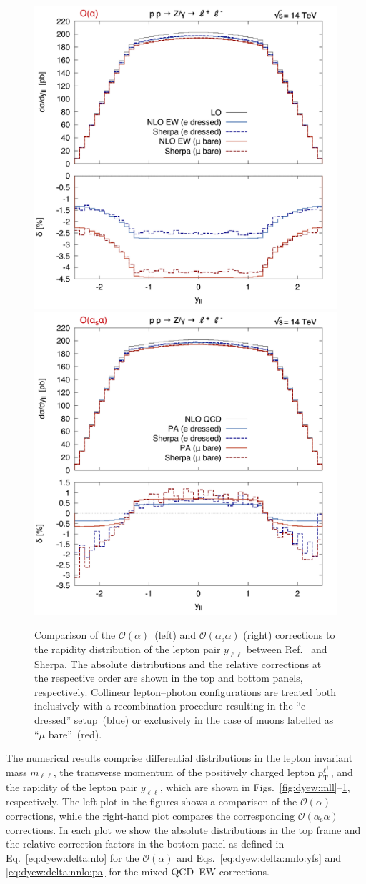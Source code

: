 \documentclass[11pt]{cernrep}
\newcommand{\order}{\ensuremath{\mathcal{O}}}
\newcommand{\alphas}{\ensuremath{\alpha_\mathrm{s}}}
\newcommand{\rT}{\ensuremath{\mathrm{T}}} %
\DeclareRobustCommand{\Pl}{{\ensuremath{\ell}}}
\DeclareRobustCommand{\Plp}{{\ensuremath{\ell^+}}}
\begin{document}
\begin{figure}
  \includegraphics[width=.48\linewidth]{images/Z_yll_LO.pdf} \hfill
  \includegraphics[width=.48\linewidth]{images/Z_yll_NLO.pdf}
  \caption{
    Comparison of the $\order(\alpha)$~(left) and $\order(\alphas\alpha)$ 
    (right) corrections to the rapidity distribution of the lepton pair 
    $y_{\Pl\Pl}$ between Ref.~\cite{Dittmaier:2015rxo} and Sherpa. The 
    absolute distributions and the relative corrections at the respective 
    order are shown in the top and bottom panels, respectively. Collinear 
    lepton--photon configurations are treated both inclusively with a 
    recombination procedure resulting in the ``e dressed'' setup~(blue) or 
    exclusively in the case of muons labelled as ``$\mu$ bare''~(red).
  }
  \label{fig:dyew:yll}
\end{figure}


The numerical results comprise differential distributions in the 
lepton invariant mass $m_{\Pl\Pl}$, the transverse momentum of the 
positively charged lepton $p_\rT^\Plp$, and the rapidity of the 
lepton pair $y_{\Pl\Pl}$, which are shown in 
Figs.~\ref{fig:dyew:mll}--\ref{fig:dyew:yll}, respectively. The left plot 
in the figures shows a comparison of the $\order(\alpha)$ corrections, 
while the right-hand plot compares the corresponding $\order(\alphas\alpha)$ 
corrections. In each plot we show the absolute distributions in 
the top frame and the relative correction factors in the bottom 
panel as defined in Eq.~\eqref{eq:dyew:delta:nlo} for the $\order(\alpha)$ 
and Eqs.~\eqref{eq:dyew:delta:nnlo:yfs} and \eqref{eq:dyew:delta:nnlo:pa} 
for the mixed QCD--EW corrections.
\end{document}
